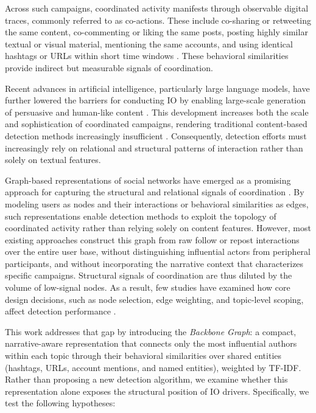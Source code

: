 \documentclass[10pt,journal,compsoc]{IEEEtran}
\begin{document}
Across such campaigns, coordinated activity manifests through observable digital traces, commonly referred to as co-actions. These include co-sharing or retweeting the same content, co-commenting or liking the same posts, posting highly similar textual or visual material, mentioning the same accounts, and using identical hashtags or URLs within short time windows \cite{luceri2024unmasking, mannocci2024detection}. These behavioral similarities provide indirect but measurable signals of coordination.

Recent advances in artificial intelligence, particularly large language models, have further lowered the barriers for conducting IO by enabling large-scale generation of persuasive and human-like content \cite{burghardt2024large}. This development increases both the scale and sophistication of coordinated campaigns, rendering traditional content-based detection methods increasingly insufficient \cite{fredheim2024assessing, luceri2024leveraging}. Consequently, detection efforts must increasingly rely on relational and structural patterns of interaction rather than solely on textual features.


Graph-based representations of social networks have emerged as a promising approach for capturing the structural and relational signals of coordination \cite{minici2025iohunter, gabriel2023inductive, pacheco2021uncovering, smith2021automatic}. By modeling users as nodes and their interactions or behavioral similarities as edges, such representations enable detection methods to exploit the topology of coordinated activity rather than relying solely on content features. However, most existing approaches construct this graph from raw follow or repost interactions over the entire user base, without distinguishing influential actors from peripheral participants, and without incorporating the narrative context that characterizes specific campaigns. Structural signals of coordination are thus diluted by the volume of low-signal nodes. As a result, few studies have examined how core design decisions, such as node selection, edge weighting, and topic-level scoping, affect detection performance \cite{coscia2019impact, backbone2022collectiveBehavior, graphCompression2018survey}.

This work addresses that gap by introducing the \textit{Backbone Graph}: a compact, narrative-aware representation that connects only the most influential authors within each topic through their behavioral similarities over shared entities (hashtags, URLs, account mentions, and named entities), weighted by TF-IDF. Rather than proposing a new detection algorithm, we examine whether this representation alone exposes the structural position of IO drivers. Specifically, we test the following hypotheses:
\end{document}
